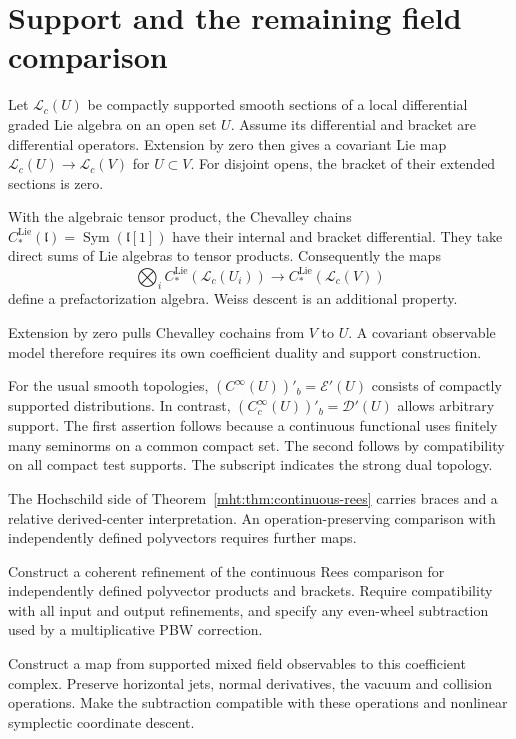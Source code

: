\section{Support and the remaining field comparison}

Let $\mathcal L_c(U)$ be compactly supported smooth sections of a
local differential graded Lie algebra on an open set $U$.
Assume its differential and bracket are differential operators.
Extension by zero then gives a covariant Lie map
$\mathcal L_c(U)\to\mathcal L_c(V)$ for $U\subset V$.
For disjoint opens, the bracket of their extended sections is zero.

With the algebraic tensor product, the Chevalley chains
$C^{\mathrm{Lie}}_*(\mathfrak l)=\operatorname{Sym}(\mathfrak l[1])$
have their internal and bracket differential. They take direct
sums of Lie algebras to tensor products. Consequently the maps
\[
 \bigotimes_i C^{\mathrm{Lie}}_*(\mathcal L_c(U_i))
 \longrightarrow C^{\mathrm{Lie}}_*(\mathcal L_c(V))
\]
define a prefactorization algebra. Weiss descent is an additional
property.

Extension by zero pulls Chevalley cochains from $V$ to $U$.
A covariant observable model therefore requires its own coefficient
duality and support construction.

For the usual smooth topologies,
$(C^\infty(U))'_b=\mathcal E'(U)$ consists of compactly supported
distributions. In contrast,
$(C^\infty_c(U))'_b=\mathcal D'(U)$ allows arbitrary support.
The first assertion follows because a continuous functional uses
finitely many seminorms on a common compact set.
The second follows by compatibility on all compact test supports.
The subscript indicates the strong dual topology.

The Hochschild side of Theorem~\ref{mht:thm:continuous-rees}
carries braces and a relative derived-center interpretation.
An operation-preserving comparison with independently defined
polyvectors requires further maps.

\begin{problem}\label{mht:qn:continuous-hamiltonian-comparison}
Construct a coherent refinement of the continuous Rees comparison
for independently defined polyvector products and brackets.
Require compatibility with all input and output refinements,
and specify any even-wheel subtraction used by a multiplicative
PBW correction.

Construct a map from supported mixed field observables to this
coefficient complex. Preserve horizontal jets, normal derivatives,
the vacuum and collision operations. Make the subtraction compatible
with these operations and nonlinear symplectic coordinate descent.
\end{problem}
